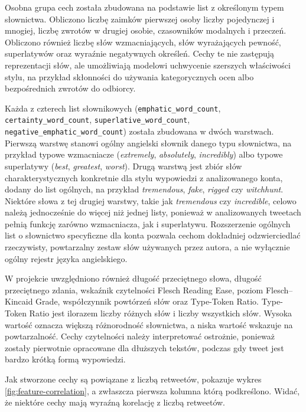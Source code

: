 \documentclass[12pt, a4paper, oneside]{scrreprt}
\begin{document}
Osobna grupa cech została zbudowana na podstawie list z określonym typem słownictwa. Obliczono
liczbę zaimków pierwszej osoby liczby pojedynczej i mnogiej, liczbę zwrotów w drugiej osobie,
czasowników modalnych i przeczeń. Obliczono również liczbę słów wzmacniających,
słów wyrażających pewność, superlatywów oraz wyraźnie negatywnych określeń.
Cechy te nie zastępują reprezentacji słów, ale umożliwiają modelowi uchwycenie
szerszych właściwości stylu, na przykład skłonności do używania kategorycznych
ocen albo bezpośrednich zwrotów do odbiorcy.

Każda z czterech list słownikowych (\texttt{emphatic\_word\_count}, \\ \texttt{certainty\_word\_count},
\texttt{superlative\_word\_count}, \\ \texttt{negative\_emphatic\_word\_count}) została zbudowana w
dwóch warstwach. Pierwszą warstwę stanowi ogólny angielski słownik danego typu słownictwa,
na przykład typowe wzmacniacze (\emph{extremely}, \emph{absolutely}, \emph{incredibly}) albo
typowe superlatywy (\emph{best}, \emph{greatest}, \emph{worst}). Drugą warstwą jest zbiór słów
charakterystycznych konkretnie dla stylu wypowiedzi z analizowanego konta, dodany do
list ogólnych, na przykład \emph{tremendous}, \emph{fake}, \emph{rigged} czy \emph{witchhunt}.
Niektóre słowa z tej drugiej warstwy, takie jak \emph{tremendous} czy \emph{incredible},
celowo należą jednocześnie do więcej niż jednej listy, ponieważ w analizowanych tweetach
pełnią funkcję zarówno wzmacniacza, jak i superlatywu. Rozszerzenie ogólnych list o słownictwo
specyficzne dla konta pozwala cechom dokładniej odzwierciedlać rzeczywisty, powtarzalny zestaw
słów używanych przez autora, a nie wyłącznie ogólny rejestr języka angielskiego.

W projekcie uwzględniono również długość przeciętnego słowa, długość przeciętnego
zdania, wskaźnik czytelności Flesch Reading Ease, poziom Flesch--Kincaid Grade,
współczynnik powtórzeń słów oraz Type-Token Ratio. Type-Token Ratio jest
ilorazem liczby różnych słów i liczby wszystkich słów. Wysoka wartość
oznacza większą różnorodność słownictwa, a niska wartość wskazuje na powtarzalność.
Cechy czytelności należy interpretować ostrożnie, ponieważ zostały pierwotnie
opracowane dla dłuższych tekstów, podczas gdy tweet jest bardzo krótką formą wypowiedzi.

Jak stworzone cechy są powiązane z liczbą retweetów, pokazuje wykres \ref{fig:feature-correlation},
a zwłaszcza pierwsza kolumna którą podkreślono.
Widać, że niektóre cechy mają wyraźną korelację z liczbą retweetów.
\end{document}
